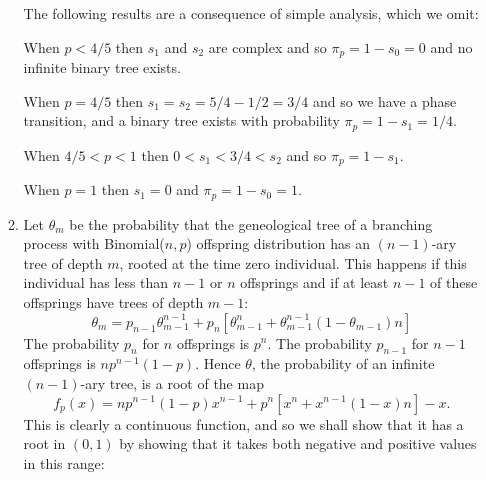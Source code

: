 \documentclass[11pt]{article} \usepackage{amssymb}
\begin{document}
\begin{enumerate}
\begin{enumerate}
    The following results are a consequence of simple analysis, which we
    omit:

    When $p<4/5$ then $s_1$ and $s_2$ are complex and so $\pi_p=1-s_0=0$ and no
    infinite binary tree exists.

    When $p=4/5$ then $s_1=s_2=5/4-1/2=3/4$ and so we have a phase transition,
    and a binary tree exists with probability $\pi_p=1-s_1=1/4$.

    When $4/5<p<1$ then $0<s_1<3/4<s_2$ and so $\pi_p=1-s_1$.

    When $p=1$ then $s_1=0$ and $\pi_p=1-s_0=1$.
  \item
    Let $\theta_m$ be the probability that the geneological tree of a 
    branching process with Binomial($n,p$) offspring distribution 
    has an $(n-1)$-ary tree of depth $m$, rooted at the time 
    zero individual. This happens if this individual has less than $n-1$ or $n$
    offsprings and if at least $n-1$ of these offsprings have trees of 
    depth $m-1$:
    $$\theta_m=p_{n-1}\theta_{m-1}^{n-1}+p_n\left[\theta_{m-1}^n+
      \theta_{m-1}^{n-1}(1-\theta_{m-1})n\right]$$
    The probability $p_n$ for $n$ offsprings is $p^n$. The probability $p_{n-1}$ 
    for $n-1$ offsprings is $np^{n-1}(1-p)$.
    Hence $\theta$, the probability of an infinite $(n-1)$-ary tree, is a root
    of the map
    $$f_p(x)=np^{n-1}(1-p)x^{n-1}+p^n\left[ x^n+x^{n-1}(1-x)n \right]-x.$$
    This is clearly a continuous function, and so we shall show that it has a 
    root in $(0,1)$ by showing that it takes both negative and positive values
    in this range:


\end{enumerate}
\end{enumerate}
\end{document}

